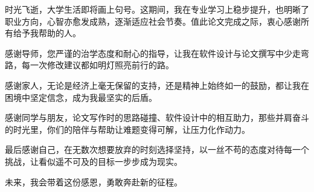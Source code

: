 
时光飞逝，大学生活即将画上句号。这期间，我在专业学习上稳步提升，也明晰了职业方向，心智亦愈发成熟，逐渐适应社会节奏。值此论文完成之际，衷心感谢所有给予我帮助的人。  

感谢导师，您严谨的治学态度和耐心的指导，让我在软件设计与论文撰写中少走弯路，每一次修改建议都如明灯照亮前行的路。  

感谢家人，无论是经济上毫无保留的支持，还是精神上始终如一的鼓励，都让我在困境中坚定信念，成为我最坚实的后盾。  

感谢同学与朋友，论文写作时的思路碰撞、软件设计中的相互助力，那些并肩奋斗的时光里，你们的陪伴与帮助让难题变得可解，让压力化作动力。  

最后感谢自己，在无数次想要放弃的时刻选择坚持，以一丝不苟的态度对待每一个挑战，让看似遥不可及的目标一步步成为现实。  

未来，我会带着这份感恩，勇敢奔赴新的征程。

